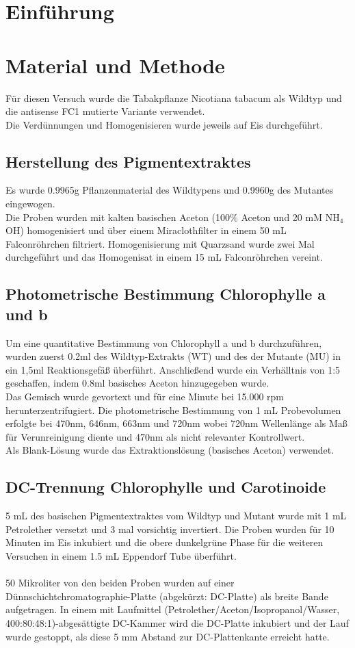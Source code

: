 \documentclass[10pt,a4paper]{article}
\begin{document}
	
	\newpage
	\section{Einführung}
	

	
	\section{Material und Methode}
	Für diesen Versuch wurde die Tabakpflanze Nicotiana tabacum als Wildtyp und die antisense FC1 mutierte Variante verwendet.\\
	Die Verdünnungen und Homogenisieren wurde jeweils auf Eis durchgeführt.
		\subsection{Herstellung des Pigmentextraktes}
		Es wurde 0.9965g Pflanzenmaterial des Wildtypens und 0.9960g des Mutantes eingewogen.\\
		Die Proben wurden mit kalten basischen Aceton (100$\%$ Aceton und 20 mM NH$_4$OH) homogenisiert und über einem Miraclothfilter in einem 50 mL Falconröhrchen filtriert. Homogenisierung mit Quarzsand wurde zwei Mal durchgeführt und das Homogenisat in einem 15 mL Falconröhrchen vereint.
		
		\subsection{Photometrische Bestimmung Chlorophylle a und b}
		Um eine quantitative Bestimmung von  Chlorophyll a und b durchzuführen, wurden zuerst 0.2ml  des Wildtyp-Extrakts (WT) und des der Mutante (MU) in ein 1,5ml Reaktionsgefäß überführt. Anschließend wurde ein Verhälltnis von 1:5 geschaffen, indem 0.8ml basisches Aceton hinzugegeben wurde.  \\
		Das Gemisch wurde gevortext und für eine Minute bei 15.000 rpm herunterzentrifugiert.
		Die photometrische Bestimmung von 1 mL Probevolumen erfolgte bei 470nm, 646nm, 663nm und 720nm wobei 720nm Wellenlänge als Maß für Verunreinigung diente und 470nm als nicht relevanter Kontrollwert.\\
		Als Blank-Lösung wurde das Extraktionslösung (basisches Aceton) verwendet.
		
		\subsection{DC-Trennung Chlorophylle und Carotinoide}
		5 mL des basischen Pigmentextraktes vom Wildtyp und Mutant wurde mit 1 mL Petrolether versetzt und 3 mal vorsichtig invertiert.
		Die Proben wurden für 10 Minuten im Eis inkubiert und die obere dunkelgrüne Phase für die weiteren Versuchen in einem 1.5 mL Eppendorf Tube überführt.\\
		\\
		50 Mikroliter von den beiden Proben wurden auf einer Dünnschichtchromatographie-Platte (abgekürzt: DC-Platte) als breite Bande aufgetragen.
		In einem mit Laufmittel (Petrolether/Aceton/Isopropanol/Wasser, 400:80:48:1)-abgesättigte DC-Kammer wird die DC-Platte inkubiert und der Lauf wurde gestoppt, als diese 5 mm Abstand zur DC-Plattenkante erreicht hatte.
\end{document}
